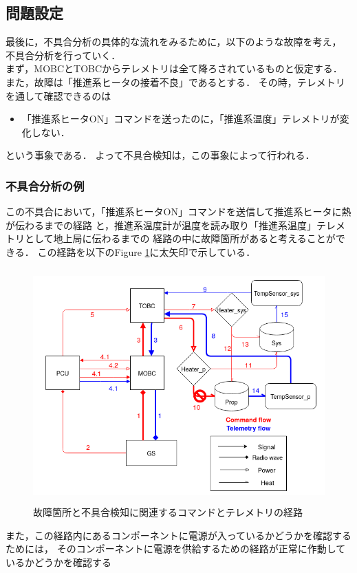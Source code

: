 \documentclass[11pt]{article}
\begin{document}
\subsection{問題設定}
最後に，不具合分析の具体的な流れをみるために，以下のような故障を考え，
不具合分析を行っていく．\\
まず，MOBCとTOBCからテレメトリは全て降ろされているものと仮定する．
また，故障は「推進系ヒータの接着不良」であるとする．
その時，テレメトリを通して確認できるのは
\begin{itemize}
   \item 「推進系ヒータON」コマンドを送ったのに，「推進系温度」テレメトリが変化しない．
\end{itemize}
という事象である．
よって不具合検知は，この事象によって行われる．

\subsubsection{不具合分析の例}
この不具合において，「推進系ヒータON」コマンドを送信して推進系ヒータに熱が伝わるまでの経路
と，推進系温度計が温度を読み取り「推進系温度」テレメトリとして地上局に伝わるまでの
経路の中に故障箇所があると考えることができる．
この経路を以下のFigure \ref{fig:simple_sat_fault}に太矢印で示している．
\begin{figure}[H]
   \centering
      \includegraphics[height=9.0cm]{figure/simple_sat_fault.png}
      \caption{故障箇所と不具合検知に関連するコマンドとテレメトリの経路}
      \label{fig:simple_sat_fault}
\end{figure}
また，この経路内にあるコンポーネントに電源が入っているかどうかを確認するためには，
そのコンポーネントに電源を供給するための経路が正常に作動しているかどうかを確認する
\end{document}
